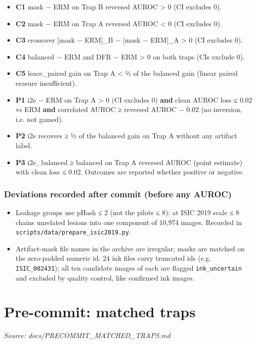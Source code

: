 {\begin{itemize}
\item
  \textbf{C1} mask − ERM on Trap B reversed AUROC \textgreater{} 0 (CI excludes 0).
\item
  \textbf{C2} mask − ERM on Trap A reversed AUROC \textless{} 0 (CI excludes 0).
\item
  \textbf{C3} crossover {[}mask − ERM{]}\_B − {[}mask − ERM{]}\_A \textgreater{} 0 (CI excludes 0).
\item
  \textbf{C4} balanced − ERM and DFR − ERM \textgreater{} 0 on both traps (CIs exclude 0).
\item
  \textbf{C5} leace\_paired gain on Trap A \textless{} ½ of the balanced gain (linear paired erasure insufficient).
\item
  \textbf{P1} i2e − ERM on Trap A \textgreater{} 0 (CI excludes 0) \textbf{and} clean AUROC loss ≤ 0.02 vs ERM \textbf{and}
  correlated AUROC ≥ reversed AUROC − 0.02 (no inversion, i.e. not gamed).
\item
  \textbf{P2} i2e recovers ≥ ½ of the balanced gain on Trap A without any artifact label.
\item
  \textbf{P3} i2e\_balanced ≥ balanced on Trap A reversed AUROC (point estimate) with clean loss ≤ 0.02.
  Outcomes are reported whether positive or negative.
\end{itemize}

\subsubsection{Deviations recorded after commit (before any AUROC)}\label{deviations-recorded-after-commit-before-any-auroc}

\begin{itemize}

\item
  Leakage groups use pHash ≤ 2 (not the pilot\textquotesingle s ≤ 8): at ISIC 2019 scale ≤ 8 chains unrelated lesions into
  one component of 10,974 images. Recorded in \texttt{scripts/data/prepare\_isic2019.py}.
\item
  Artifact-mask file names in the archive are irregular; masks are matched on the zero-padded numeric id.
  24 ink files carry truncated ids (e.g. \texttt{ISIC\_002431}); all ten candidate images of each are flagged
  \texttt{ink\_uncertain} and excluded by quality control, like confirmed ink images.
\end{itemize}

}

\section{Pre-commit: matched traps}\label{doc:PRECOMMIT_MATCHED_TRAPS}
\noindent\textit{Source: docs/PRECOMMIT\_MATCHED\_TRAPS.md}

